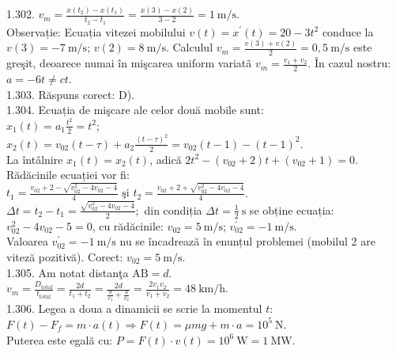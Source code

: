 1.302. $v_{m}=\frac{x\left(t_{2}\right)-x\left(t_{1}\right)}{t_{2}-t_{1}}=\frac{x(3)-x(2)}{3-2}=1 \mathrm{~m} / \mathrm{s}$.\\ Observație: Ecuația vitezei mobilului $v(t)=x^{\prime}(t)=20-3 t^{2}$ conduce la $v(3)=-7 \mathrm{~m} / \mathrm{s}$; $v(2)=8 \mathrm{~m} / \mathrm{s}$. Calculul $v_{m}=\frac{v(3)+v(2)}{2}=0,5 \mathrm{~m} / \mathrm{s}$ este greşit, deoarece numai în mişcarea uniform variatã $v_{m}=\frac{v_{1}+v_{2}}{2}$. În cazul nostru: $a=-6 t \neq c t$.\\

1.303. Răspuns corect: D).\\

1.304. Ecuația de mişcare ale celor două mobile sunt:\\ $x_{1}(t)=a_{1} \frac{t^{2}}{2}=t^{2}$;\\ $x_{2}(t)=v_{02}(t-\tau)+a_{2} \frac{(t-\tau)^{2}}{2}=v_{02}(t-1)-(t-1)^{2}$.\\ La întâlnire $x_{1}(t)=x_{2}(t)$, adică $2 t^{2}-\left(v_{02}+2\right) t+\left(v_{02}+1\right)=0$. Rădăcinile ecuației vor fi:\\ $t_{1}=\frac{v_{02}+2-\sqrt{v_{02}^{2}-4 v_{02}-4}}{4} \text { şi } t_{2}=\frac{v_{02}+2+\sqrt{v_{02}^{2}-4 v_{02}-4}}{4}$.\\ $\Delta t=t_{2}-t_{1}=\frac{\sqrt{v_{02}^{2}-4 v_{02}-4}}{2};$ din condiția $\Delta t=\frac{1}{2} \mathrm{~s}$ se obține ecuația:\\ $v_{02}^{2}-4 v_{02}-5=0$, cu rădăcinile: $v_{02}=5 \mathrm{~m} / \mathrm{s}$; $v_{02}^{\prime}=-1 \mathrm{~m} / \mathrm{s}$.\\ Valoarea $v_{02}^{\prime}=-1 \mathrm{~m} / \mathrm{s}$ nu se încadrează în enunțul problemei (mobilul 2 are viteză pozitivă). Corect: $v_{02}=5 \mathrm{~m} / \mathrm{s}$.\\

1.305. Am notat distanţa $\mathrm{AB}=d$.\\ $v_{m}=\frac{D_{\text {total}}}{t_{\text {total}}}=\frac{2 d}{t_{1}+t_{2}}=\frac{2 d}{\frac{d}{v_{1}}+\frac{d}{v_{2}}}=\frac{2 v_{1} v_{2}}{v_{1}+v_{2}}=48 \mathrm{~km} / \mathrm{h}$.\\

1.306. Legea a doua a dinamicii se scrie la momentul $t$:\\ $F(t)-F_{f}=m \cdot a(t) \Rightarrow F(t)=\mu m g+m \cdot a=10^{5} \mathrm{~N}$.\\ Puterea este egală cu: $P=F(t) \cdot v(t)=10^{6} \mathrm{~W}=1 \mathrm{~MW}$.\\

